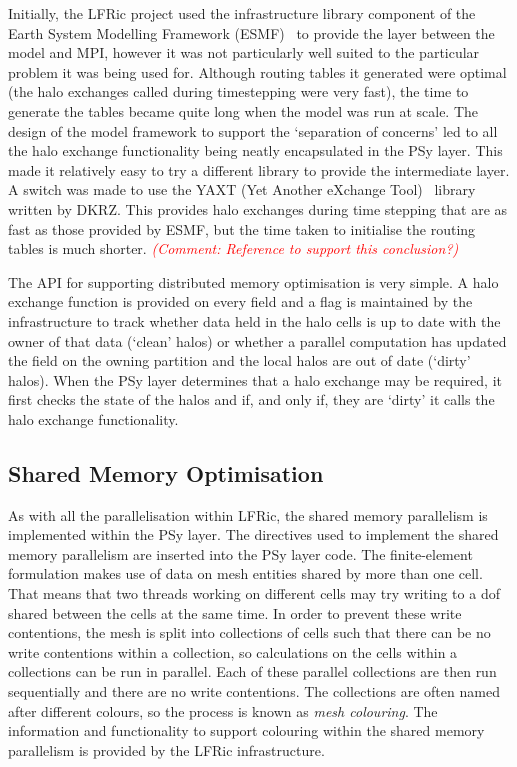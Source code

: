 \documentclass[times]{elsarticle}
\begin{document}
Initially, the LFRic project used the infrastructure library component
of the Earth System Modelling Framework (ESMF)~\cite{ESMFDocs} to
provide the layer between the model and MPI, however it was not particularly
well suited to the particular problem it was being used for. Although
routing tables it generated were optimal (the halo exchanges called
during timestepping were very fast), the time to generate the tables
became quite long when the model was run at scale. The design of the
model framework to support the `separation of concerns' led to all the
halo exchange functionality being neatly encapsulated in the PSy layer.
This made it relatively easy to try a different library to provide the
intermediate layer. A switch was made to use the YAXT (Yet Another
eXchange Tool)~\cite{YAXTDocs} library written by DKRZ. This provides
halo exchanges during time stepping that are as fast as those provided
by ESMF, but the time taken to initialise the routing tables is much
shorter. \textcolor{red}{\em (Comment: Reference to support this conclusion?)} 

The API for supporting distributed memory optimisation is very simple. A
halo exchange function is provided on every field and a flag is
maintained by the infrastructure to track whether data held in the halo
cells is up to date with the owner of that data (`clean' halos) or
whether a parallel computation has updated the field on the owning
partition and the local halos are out of date (`dirty' halos). When the
PSy layer determines that a halo exchange may be required, it first
checks the state of the halos and if, and only if, they are `dirty' it calls the halo
exchange functionality.

\subsection{\label{sec:sharedmem}Shared Memory Optimisation}

As with all the parallelisation within LFRic, the shared memory
parallelism is implemented within the PSy layer. The directives used to
implement the shared memory parallelism are inserted into the PSy layer
code. The finite-element formulation makes use of data on mesh entities
shared by more than one cell. That means that two threads working on
different cells may try writing to a dof shared between the cells at the
same time. In order to prevent these write contentions, the mesh is
split into collections of cells such that there can be no write
contentions within a collection, so calculations on the cells within a
collections can be run in parallel. Each of these parallel collections
are then run sequentially and there are no write contentions. The
collections are often named after different colours, so the process is
known as {\em mesh colouring}. The information and functionality to support
colouring within the shared memory parallelism is provided by the LFRic
infrastructure.
\end{document}
